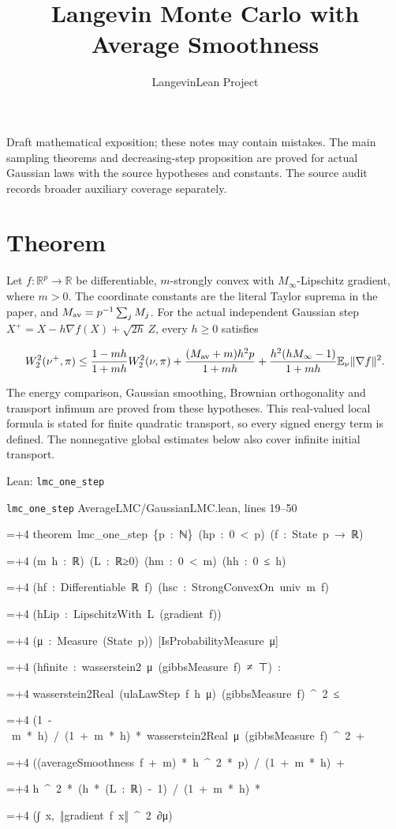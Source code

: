 \documentclass[11pt,a4paper]{article}
\title{\texorpdfstring{Langevin Monte Carlo with Average Smoothness}{Langevin Monte Carlo with Average Smoothness}}
\author{LangevinLean Project}
\date{}
\newlength{\leancharwidth}
\newenvironment{leancode}{\par\smallskip\begingroup\ttfamily\footnotesize\raggedright
  \settowidth{\leancharwidth}{M}\setlength{\parskip}{0pt}\setlength{\parindent}{0pt}
  \frenchspacing}{\par\endgroup\smallskip}
\newcommand{\leanline}[2]{\hangindent=\dimexpr#1\leancharwidth+4\leancharwidth\relax
  \hangafter=1\noindent\hspace*{#1\leancharwidth}#2\par}
\newcommand{\leansource}[1]{\par{\footnotesize\color{leanmuted}#1}\par}
\begin{document}
\maketitle
Draft mathematical exposition; these notes may contain mistakes.
The main sampling theorems and decreasing-step proposition are proved for actual Gaussian laws with the source hypotheses and constants. The source audit records broader auxiliary coverage separately.
\section{\texorpdfstring{Theorem}{Theorem}}


Let \(f:\mathbb R^p\to\mathbb R\) be differentiable,
\(m\)-strongly convex with \(M_\infty\)-Lipschitz gradient, where
\(m>0\). The coordinate constants are the literal Taylor suprema in the
paper, and \(M_{\rm av}=p^{-1}\sum_j M_j\). For the actual independent
Gaussian step \(X^+=X-h\nabla f(X)+\sqrt{2h}\,Z\), every \(h\ge0\) satisfies


\[W_2^2(\nu^+,\pi)\le
\frac{1-mh}{1+mh}W_2^2(\nu,\pi)+
\frac{(M_{\rm av}+m)h^2p}{1+mh}+
\frac{h^2(hM_\infty-1)}{1+mh}\mathbb E_\nu\|\nabla f\|^2.\]


The energy comparison, Gaussian smoothing, Brownian orthogonality and
transport infimum are proved from these hypotheses. This real-valued local
formula is stated for finite quadratic transport, so every signed energy term
is defined. The nonnegative global estimates below also cover infinite
initial transport.

\begin{leanbox}{Lean: \texttt{lmc\_\allowbreak{}one\_\allowbreak{}step}}
\leansource{\texttt{lmc\_\allowbreak{}one\_\allowbreak{}step} \quad AverageLMC/\allowbreak{}GaussianLMC.lean, lines 19–50}
\begin{leancode}
\leanline{0}{theorem\ lmc\_one\_step\ \{p\ :\ ℕ\}\ (hp\ :\ 0\ <\ p)\ (f\ :\ State\ p\ →\ ℝ)}
\leanline{4}{(m\ h\ :\ ℝ)\ (L\ :\ ℝ≥0)\ (hm\ :\ 0\ <\ m)\ (hh\ :\ 0\ ≤\ h)}
\leanline{4}{(hf\ :\ Differentiable\ ℝ\ f)\ (hsc\ :\ StrongConvexOn\ univ\ m\ f)}
\leanline{4}{(hLip\ :\ LipschitzWith\ L\ (gradient\ f))}
\leanline{4}{(μ\ :\ Measure\ (State\ p))\ [IsProbabilityMeasure\ μ]}
\leanline{4}{(hfinite\ :\ wasserstein2\ μ\ (gibbsMeasure\ f)\ ≠\ ⊤)\ :}
\leanline{4}{wasserstein2Real\ (ulaLawStep\ f\ h\ μ)\ (gibbsMeasure\ f)\ \textasciicircum{}\ 2\ ≤}
\leanline{6}{(1\ -\ m\ *\ h)\ /\ (1\ +\ m\ *\ h)\ *\ wasserstein2Real\ μ\ (gibbsMeasure\ f)\ \textasciicircum{}\ 2\ +}
\leanline{6}{((averageSmoothness\ f\ +\ m)\ *\ h\ \textasciicircum{}\ 2\ *\ p)\ /\ (1\ +\ m\ *\ h)\ +}
\leanline{6}{h\ \textasciicircum{}\ 2\ *\ (h\ *\ (L\ :\ ℝ)\ -\ 1)\ /\ (1\ +\ m\ *\ h)\ *}
\leanline{8}{(∫\ x,\ ‖gradient\ f\ x‖\ \textasciicircum{}\ 2\ ∂μ)}
\end{leancode}
\end{leanbox}
\end{document}

